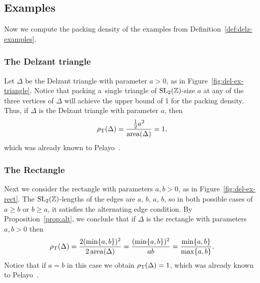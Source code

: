 \documentclass[pdftex]{sigma}
\numberwithin{equation}{section}
\def\Z{{\mathbb Z}}
\newcommand{\De}{\Delta}
\newcommand{\area}{\operatorname{area}}
\newcommand{\SL}{{\rm SL}_2(\Z)}
\begin{document}



\subsection{Examples}

Now we compute the packing density of the examples from Definition~\ref{def:delz-examples}.

\subsubsection{The Delzant triangle}
Let $\De$ be the Delzant triangle with parameter $a>0$, as in Figure~\ref{fig:del-ex-triangle}.
Notice that packing a~single triangle of $\SL$-size $a$ at any of the three vertices of $\De$ will achieve the upper bound of 1 for the packing density.
Thus, if $\De$ is the Delzant triangle with parameter $a$, then
\begin{equation}\label{eqn:pack-density-triangle}
 \rho_{{\rm T}}(\De) = \frac{\frac{1}{2}a^2}{\area(\De)} = 1,
\end{equation}
which was already known to Pelayo~\cite{Pe2006}.

\subsubsection{The Rectangle} Next we consider the rectangle with parameters $a,b>0$, as in Figure~\ref{fig:del-ex-rect}. The $\SL$-lengths of the edges are $a$, $b$, $a$, $b$, so in both possible cases of $a\geq b$ or $b\geq a$, it satisfies the alternating edge condition. By Proposition~\ref{prop:alt}, we conclude that if $\De$ is the rectangle with parameters~$a,b>0$ then
\begin{equation}\label{eqn:pack-density-rect}
 \rho_{{\rm T}}(\De) = \frac{2(\min\{a,b\})^2}{2\area(\De)} = \frac{(\min\{a,b\})^2}{ab}=\frac{\min\{a,b\}}{\max\{a,b\}}.
\end{equation}
Notice that if $a=b$ in this case we obtain $\rho_{{\rm T}}(\De) =1$, which was already known to Pelayo~\cite{Pe2006}.
\end{document}
